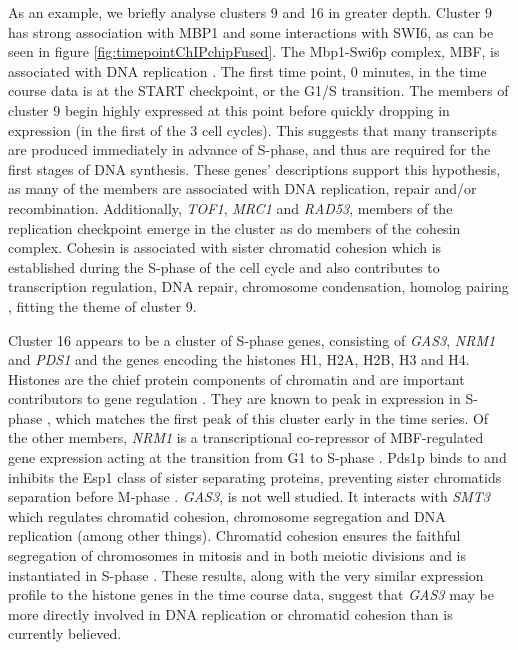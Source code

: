 \documentclass{bmcart}
\begin{document}
	As an example, we briefly analyse clusters 9 and 16 in greater depth. Cluster 9 has strong association with MBP1 and some interactions with SWI6, as can be seen in figure \ref{fig:timepointChIPchipFused}. The Mbp1-Swi6p complex, MBF, is associated with DNA replication \citep{iyer2001genomic}. The first time point, 0 minutes, in the time course data is at the START checkpoint, or the G1/S transition. The members of cluster 9 begin highly expressed at this point before quickly dropping in expression (in the first of the 3 cell cycles). This suggests that many transcripts are produced immediately in advance of S-phase, and thus are required for the first stages of DNA synthesis.
	These genes' descriptions \citep[found using \texttt{org.Sc.sgd.db},][and shown in table 3 of the Supplementary Material]{carlson2014org} support this hypothesis, as many of the members are associated with DNA replication, repair and/or recombination. Additionally, \emph{TOF1}, \emph{MRC1} and \emph{RAD53}, members of the replication checkpoint \citep{bando2009csm3, lao2018yeast} emerge in the cluster as do members of the cohesin complex. Cohesin is associated with sister chromatid cohesion which is established during the S-phase of the cell cycle \citep{toth1999yeast} and also contributes to transcription regulation, DNA repair, chromosome condensation, homolog pairing \citep{mehta2013cohesin}, fitting the theme of cluster 9.
	
	Cluster 16 appears to be a cluster of S-phase genes, consisting of \emph{GAS3}, \emph{NRM1} and \emph{PDS1} and the genes encoding the histones H1, H2A, H2B, H3 and H4. Histones are the chief protein components of chromatin \citep{fischle2003histone} and are important contributors to gene regulation \citep{bannister2011regulation}. They are known to peak in expression in S-phase \citep{granovskaia2010high}, which matches the first peak of this cluster early in the time series. Of the other members, \emph{NRM1} is a transcriptional co-repressor of MBF-regulated gene expression acting at the transition from G1 to S-phase \citep{de2006constraining, aligianni2009fission}. Pds1p binds to and inhibits the Esp1 class of sister separating proteins, preventing sister chromatids separation before M-phase \citep{ciosk1998esp1, toth1999yeast}. \emph{GAS3}, is not well studied. It interacts with \emph{SMT3} which regulates chromatid cohesion, chromosome segregation and DNA replication (among other things). Chromatid cohesion ensures the faithful segregation of chromosomes in mitosis and in both meiotic divisions \citep{cooper2009pds1p} and is instantiated in S-phase \citep{toth1999yeast}. These results, along with the very similar expression profile to the histone genes in the time course data, suggest that \emph{GAS3} may be more directly involved in DNA replication or chromatid cohesion than is currently believed.
	
\end{document}
